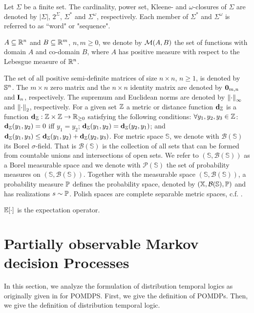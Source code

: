 \documentclass{ifacconf}
\begin{document}
    Let $\Sigma$ be a finite set. The cardinality,
    power set, Kleene- and $\omega$-closures
    of $\Sigma$ are denoted by $|\Sigma|$,
    $2^{\Sigma}$, $\Sigma^*$ and $\Sigma^\omega$,
    respectively.    
    Each member of $\Sigma^*$ and $\Sigma^\omega$ is referred to as ``word" or "sequence". 
    
    
    $A \subseteq \BB{R}^n$ and $B \subseteq \BB{R}^m$,
    $n, m \geq 0$, we denote by $\CA{M}(A, B)$ the set of
    functions with domain $A$ and co-domain $B$, where $A$ has positive measure with
    respect to the Lebesgue measure of $\BB{R}^n$.
    
    
    The set of all positive semi-definite matrices of size
    $n \times n$, $n \geq 1$, is denoted by $\S^n$.    The $m \times n$ zero matrix and
    the $n \times n$ identity matrix are denoted by
    $\BF{0}_{m, n}$ and $\BF{I}_n$, respectively.
    The supremum and Euclidean norms are denoted by
    $\norminf{\cdot}$ and $\normeucl{\cdot}$, respectively.
    For a given set $\Z$ a metric or distance function $\mathbf d_\Z$ is a function $\mathbf{d}_\Z: \Z\times \Z\rightarrow \mathbb R_{\ge 0}$ 
satisfying the following conditions: 
$\forall y_1,y_2,y_3\in\Z$:
$\mathbf d_\Z(y_1,y_2)=0$ iff $y_1=y_2$; 
$\mathbf d_\Z(y_1,y_2)=\mathbf d_{\Z}(y_2,y_1)$;  and
$\mathbf d_\Z(y_1,y_3)\leq \mathbf d_\Z(y_1,y_2) +\mathbf d_\Z(y_2,y_3)$. 
For metric space $\mathbb S$, we denote with  $\mathcal{B}(\mathbb S)$ its Borel $\sigma$-field. That is  $\mathcal{B}(\mathbb S)$ is the  
collection of all sets that can be formed from countable unions and intersections of open sets.
We refer to  $(\mathbb S,\mathcal{B}(\mathbb S))$ as a Borel measurable space and we denote with $\mathcal P(\mathbb S)$ the set of probability measures on $(\mathbb S,\mathcal{B}(\mathbb S))$.
Together with the measurable space $(\mathbb S,\mathcal{B}(\mathbb S))$,  a probability measure $\po$ defines the probability space, denoted by $(\X,\mathcal{B}(\mathbb S),\po)$ and has realizations  $s\sim \po$.   
Polish spaces are complete separable metric spaces, c.f. \cite{bogachev2007measure}. 

    $\BB{E}[\cdot]$ is the expectation operator.

    
 
\section{Partially observable Markov decision Processes}
In this section, we  analyze the formulation of distribution temporal logics as originally given in \cite{JonesDTL2013} for POMDPS. 
First, we give the definition of POMDPs. Then,  we  give the definition of distribution temporal logic. 
\end{document}
